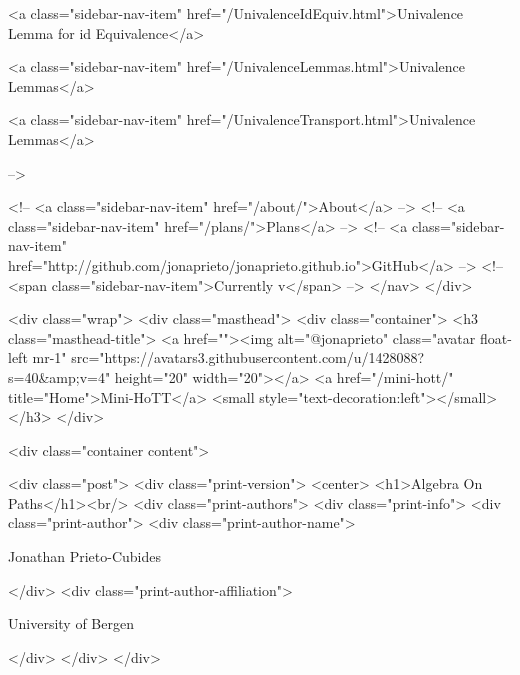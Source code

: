       
    
      
        
          <a class="sidebar-nav-item" href="/UnivalenceIdEquiv.html">Univalence Lemma for id Equivalence</a>
        
      
    
      
        
          <a class="sidebar-nav-item" href="/UnivalenceLemmas.html">Univalence Lemmas</a>
        
      
    
      
        
          <a class="sidebar-nav-item" href="/UnivalenceTransport.html">Univalence Lemmas</a>
        
      
     -->

    <!-- <a class="sidebar-nav-item" href="/about/">About</a> -->
    <!-- <a class="sidebar-nav-item" href="/plans/">Plans</a> -->
    <!-- <a class="sidebar-nav-item" href="http://github.com/jonaprieto/jonaprieto.github.io">GitHub</a> -->
    <!-- <span class="sidebar-nav-item">Currently v</span> -->
  </nav>
</div>

    <div class="wrap">
      <div class="masthead">
        <div class="container">
          <h3 class="masthead-title">
            <a href=""><img alt="@jonaprieto" class="avatar float-left mr-1" src="https://avatars3.githubusercontent.com/u/1428088?s=40&amp;v=4" height="20" width="20"></a>
            <a href="/mini-hott/" title="Home">Mini-HoTT</a>
            <small style="text-decoration:left"></small>
          </h3>
        </div>
      
      <div class="container content">
        







<div class="post">
  <div class="print-version">
    <center>
      <h1>Algebra On Paths</h1><br/>
        <div class="print-authors">
          <div class="print-info">
            <div class="print-author">
              <div class="print-author-name">
                
                  Jonathan Prieto-Cubides
                
              </div>
              <div class="print-author-affiliation">
                
                  University of Bergen
                
                </div>
            </div>
          </div>
          
